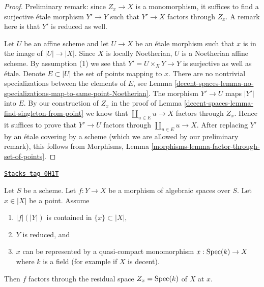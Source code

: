 \begin{proof}
Preliminary remark: since $Z_x \to X$ is a monomorphism, it suffices to find
a surjective \'etale morphism $Y' \to Y$ such that $Y' \to X$
factors through $Z_x$. A remark here is that $Y'$ is reduced as well.

\medskip\noindent
Let $U$ be an affine scheme and let $U \to X$ be an \'etale morphism
such that $x$ is in the image of $|U| \to |X|$. Since $X$ is locally
Noetherian, $U$ is a Noetherian affine scheme. By assumption (1)
we see that $Y' = U \times_X Y \to Y$ is surjective as well as \'etale.
Denote $E \subset |U|$ the set of points mapping to $x$.
There are no nontrivial specializations between the elements of $E$, see
Lemma \ref{decent-spaces-lemma-no-specializations-map-to-same-point-Noetherian}.
The morphism $Y' \to U$ maps $|Y'|$ into $E$. By our construction
of $Z_x$ in the proof of Lemma \ref{decent-spaces-lemma-find-singleton-from-point}
we know that $\coprod_{u \in E} u \to X$ factors through $Z_x$.
Hence it suffices to prove that $Y' \to U$ factors through
$\coprod_{u \in E} u \to X$. After replacing $Y'$ by an \'etale covering
by a scheme (which we are allowed by our preliminary remark), this follows
from Morphisms, Lemma \ref{morphisms-lemma-factor-through-set-of-points}.
\end{proof}

\begin{lemma}
\label{decent-spaces-lemma-factor-through-residual-space-decent}
\href{https://stacks.math.columbia.edu/tag/0H1T}{\texttt{Stacks tag 0H1T}}

Let $S$ be a scheme. Let $f : Y \to X$ be a morphism of algebraic
spaces over $S$. Let $x \in |X|$ be a point. Assume
\begin{enumerate}
\item $|f|(|Y|)$ is contained in $\{x\} \subset |X|$,
\item $Y$ is reduced, and
\item $x$ can be represented by a quasi-compact monomorphism
$x : \operatorname{Spec}(k) \to X$ where $k$ is a field (for example if $X$ is decent).
\end{enumerate}
Then $f$ factors through
the residual space $Z_x = \operatorname{Spec}(k)$ of $X$ at $x$.
\end{lemma}

